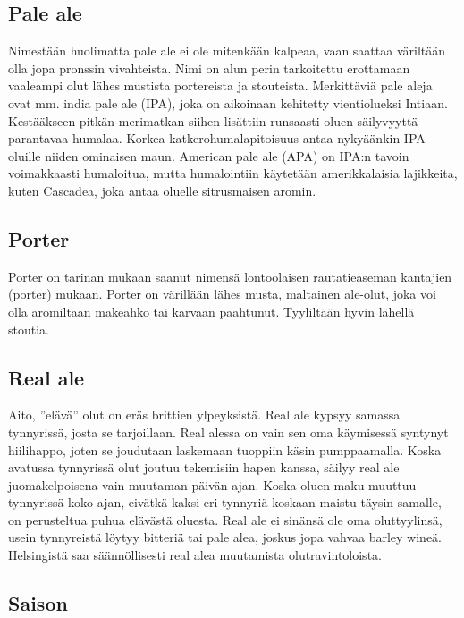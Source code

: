 \documentclass[a4paper,11pt]{report}
\begin{document}
\subsection*{Pale ale}

Nimestään huolimatta pale ale ei ole mitenkään kalpeaa, vaan saattaa väriltään olla jopa pronssin vivahteista. Nimi on alun perin tarkoitettu erottamaan vaaleampi olut lähes mustista portereista ja stouteista. Merkittäviä pale aleja ovat mm. india pale ale (IPA), joka on aikoinaan kehitetty vientiolueksi Intiaan. Kestääkseen pitkän merimatkan siihen lisättiin runsaasti oluen säilyvyyttä parantavaa humalaa. Korkea katkerohumalapitoisuus antaa nykyäänkin IPA-oluille niiden ominaisen maun. American pale ale (APA) on IPA:n tavoin voimakkaasti humaloitua, mutta humalointiin käytetään amerikkalaisia lajikkeita, kuten Cascadea, joka antaa oluelle sitrusmaisen aromin.

\subsection*{Porter}

Porter on tarinan mukaan saanut nimensä lontoolaisen rautatieaseman kantajien (porter) mukaan. Porter on värillään lähes musta, maltainen ale-olut, joka voi olla aromiltaan makeahko tai karvaan paahtunut. Tyyliltään hyvin lähellä stoutia.

\subsection*{Real ale}

Aito, ''elävä'' olut on eräs brittien ylpeyksistä. Real ale kypsyy samassa tynnyrissä, josta se tarjoillaan. Real alessa on vain sen oma käymisessä syntynyt hiilihappo, joten se joudutaan laskemaan tuoppiin käsin pumppaamalla. Koska avatussa tynnyrissä olut joutuu tekemisiin hapen kanssa, säilyy real ale juomakelpoisena vain muutaman päivän ajan. Koska oluen maku muuttuu tynnyrissä koko ajan, eivätkä kaksi eri tynnyriä koskaan maistu täysin samalle, on perusteltua puhua elävästä oluesta. Real ale ei sinänsä ole oma oluttyylinsä, usein tynnyreistä löytyy bitteriä tai pale alea, joskus jopa vahvaa barley wineä. Helsingistä saa säännöllisesti real alea muutamista olutravintoloista.

\subsection*{Saison}
\end{document}

